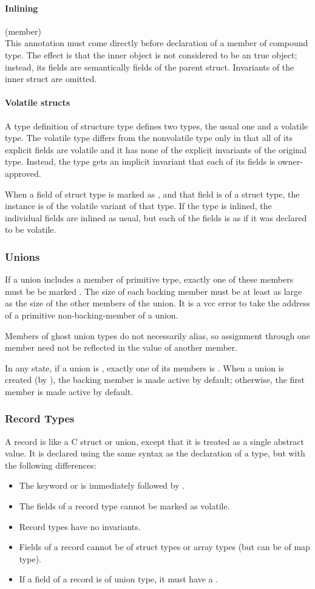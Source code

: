 \documentclass[preprint,nocopyrightspace]{sigplanconf}
\newcommand{\subsubsubsection}[1]{\paragraph{#1}}
\begin{document}
{{{{\subsubsubsection{Inlining}

 (member)\\
This annotation must come directly before declaration of a member of compound
type. The effect is that the inner object is not considered to be an
true object; instead, its fields are semantically fields of the
parent struct. Invariants of the inner struct are omitted.

\subsubsubsection{Volatile structs}
A type definition of structure type defines two types, the usual one
and a volatile type. The volatile type differs from the nonvolatile
type only in that all of its explicit fields are volatile and it has
none of the explicit invariants of the original type. Instead, the
type gets an implicit invariant that each of its fields is
owner-approved. 

When a field of struct type is marked as , and that
field is of a struct type, the instance is of the volatile variant of
that type. If the type is inlined, the individual fields are inlined
as usual, but each of the fields is as if it was declared to be
volatile. 

\subsubsection{Unions}
If a union includes a member of primitive type, exactly one of
these members must be be marked . The size of
each backing member must be at least as large as the size of the other
members of the union. It is a vcc error to take the address of a
primitive non-backing-member of a union. 

Members of ghost union types do not necessarily alias, so assignment
through one member need not be reflected in the value of another
member.  

In any state, if a union is \vcc{\valid}, exactly one of its members
is \vcc{\valid}. When a union is created (by \vcc{\unblobify}), the
backing member is made active by default; otherwise, the first member
is made active by default. 

\subsubsection{Record Types}
A record is like a C struct or union, except that it is treated as a single
abstract value. It is declared using the same syntax as the
declaration of a  type, but with the following
differences:
\begin{itemize}
\item The keyword  or  is immediately followed by
 .
\item The fields of a record type cannot be marked as volatile.
\item Record types have no invariants.
\item Fields of a record cannot be of struct types or array types (but
can be of map type). 
\item If a field of a record is of union type, it must have
a .
\end{itemize}

}}}}
\end{document}
